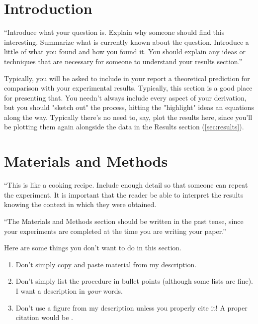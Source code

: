 \documentclass[10pt,twocolumn]{article}
\begin{document}


\section{Introduction} 
\label{sec:introduction}

``Introduce what your question is. Explain why someone should find this interesting. Summarize what is currently known about the question. Introduce a little of what you found and how you found it. You should explain any ideas or techniques that are necessary for someone to understand your results section.''

Typically, you will be asked to include in your report a theoretical prediction for comparison with your experimental results. Typically, this section is a good place for presenting that. You needn't always include every aspect of your derivation, but you should "sketch out" the process, hitting the "highlight" ideas an equations along the way. Typically there's no need to, say, plot the results here, since you'll be plotting them again alongside the data in the Results section (\autoref{sec:results}). 

\section{Materials and Methods}

``This is like a cooking recipe. Include enough detail so that someone can repeat the experiment. It is important that the reader be able to interpret the results knowing the context in which they were obtained.

``The Materials and Methods section should be written in the past tense, since your experiments are completed at the time you are writing your paper.''

Here are some things you don't want to do in this section.

\begin{enumerate}
\item 
Don't simply copy and paste material from my description. 
\item 
Don't simply list the procedure in bullet points (although some lists are fine). I want a description in \emph{your} words.
\item
Don't use a figure from my description unless you properly cite it! A proper citation would be \citep[p.~32]{Picone2018}.
\end{enumerate}
\end{document}
